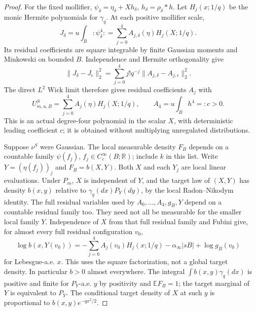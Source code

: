 \documentclass[11pt]{article}
\theoremstyle{plain}
\theoremstyle{definition}
\theoremstyle{remark}
\newcommand{\R}{\mathbb{R}}
\newcommand{\E}{\mathbb{E}}
\begin{document}
\begin{proof}
For the fixed mollifier, $\psi_\delta=\eta_\delta+Xh_\delta$,
$h_\delta=\rho_\delta*h$. Let $H_j(x;1/q)$ be the monic Hermite
polynomials for $\gamma_q$. At each positive mollifier scale,
\[
 J_\delta=u\int_B{:}\psi_\delta^4{:}
       =\sum_{j=0}^4 A_{j,\delta}(\eta)H_j(X;1/q).
\]
Its residual coefficients are square integrable by finite Gaussian
moments and Minkowski on bounded $B$. Independence and Hermite
orthogonality give
\begin{equation}\label{eq:interior-Hermite}
 \|J_\delta-J_\epsilon\|_2^2
 =\sum_{j=0}^4j!q^{-j}\|A_{j,\delta}-A_{j,\epsilon}\|_2^2.
\end{equation}
The direct $L^2$ Wick limit therefore gives residual coefficients $A_j$
with
\begin{equation}\label{eq:interior-quartic}
 U^S_{m,u,B}=\sum_{j=0}^4A_j(\eta)H_j(X;1/q),\qquad
 A_4=u\int_Bh^4=:c>0.
\end{equation}
This is an actual degree-four polynomial in the scalar $X$, with
deterministic leading coefficient $c$; it is obtained without multiplying
unregulated distributions.

Suppose $\nu^S$ were Gaussian. The local measurable density $F_B$
depends on a countable family $\psi(f_j)$, $f_j\in C_c^\infty(B;\R)$;
include $k$ in this list. Write $Y=(\eta(f_j))_j$ and
$F_B=b(X,Y)$. Both $X$ and each $Y_j$ are local linear evaluations.
Under $P_m$, $X$ is independent of $Y$, and the target law of $(X,Y)$
has density $b(x,y)$ relative to $\gamma_q(dx)P_Y(dy)$, by the local
Radon--Nikodym identity. The full residual variables used by
$A_0,\ldots,A_4,g_B,Y$ depend on a countable residual family too.
They need not all be measurable for the smaller local family $Y$.
Independence of $X$ from that full residual family and Fubini give, for
almost every full residual configuration $v_0$,
\begin{equation}\label{eq:conditional-quartic-log}
 \log b(x,Y(v_0))
 =-\sum_{j=0}^4A_j(v_0)H_j(x;1/q)
   -\alpha_\infty|sB|+\log g_B(v_0)
\end{equation}
for Lebesgue-a.e. $x$. This uses the square factorization, not a global
target density. In particular $b>0$ almost everywhere. The integral
$\int b(x,y)\gamma_q(dx)$ is positive and finite for $P_Y$-a.e. $y$
by positivity and $\E F_B=1$; the target marginal of $Y$ is equivalent
to $P_Y$. The conditional target density of $X$ at such $y$ is
proportional to $b(x,y)e^{-qx^2/2}$.


\end{proof}
\end{document}
